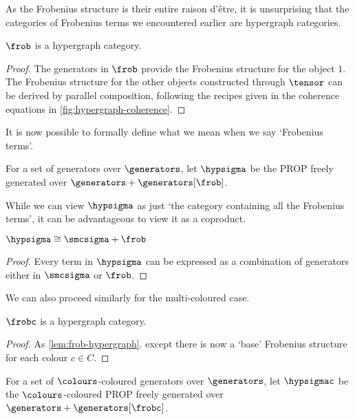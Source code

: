 As the Frobenius structure is their entire raison d'\^{e}tre, it is unsurprising
that the categories of Frobenius terms we encountered earlier are hypergraph
categories.

\begin{lemma}\label{lem:frob-hypergraph}
    \(\frob\) is a hypergraph category.
\end{lemma}
\begin{proof}
    The generators in \(\frob\) provide the Frobenius structure for the object
    \(1\).
    The Frobenius structure for the other objects constructed through
    \(\tensor\) can be derived by parallel composition, following the recipes
    given in the coherence equations in \cref{fig:hypergraph-coherence}.
\end{proof}

It is now possible to formally define what we mean when we say `Frobenius
terms'.

\begin{definition}
    For a set of generators over \(\generators\), let \(\hypsigma\) be the PROP
    freely generated over \(\generators + \generators[\frob]\).
\end{definition}

While we can view \(\hypsigma\) as just `the category containing all the
Frobenius terms', it can be advantageous to view it as a coproduct.

\begin{lemma}
    \(\hypsigma \cong \smcsigma + \frob\)
\end{lemma}
\begin{proof}
    Every term in \(\hypsigma\) can be expressed as a combination of
    generators either in \(\smcsigma\) or \(\frob\).
\end{proof}

We can also proceed similarly for the multi-coloured case.

\begin{lemma}\label{lem:frobc-hypergraph}
    \(\frobc\) is a hypergraph category.
\end{lemma}
\begin{proof}
    As \cref{lem:frob-hypergraph}. except there is now a `base' Frobenius
    structure for each colour \(c \in C\).
\end{proof}

\begin{definition}
    For a set of \(\colours\)-coloured generators over \(\generators\), let
    \(\hypsigmac\) be the \(\colours\)-coloured PROP freely generated over
    \(\generators + \generators[\frobc]\).
\end{definition}


